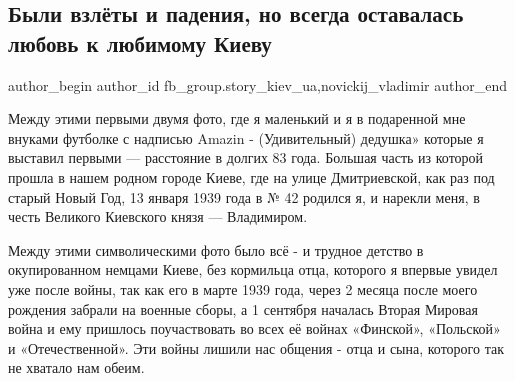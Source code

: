  
 
 
 
 
 
\subsection{Были взлёты и падения, но всегда оставалась любовь к любимому Киеву}
\label{sec:13_01_2022.fb.fb_group.story_kiev_ua.2.vzlety_i_padenia}
 
\ifcmt
 author_begin
   author_id fb_group.story_kiev_ua,novickij_vladimir
 author_end
\fi

Между этими первыми двумя фото, где я маленький и  я в подаренной мне внуками
футболке с надписью  Amazin - (Удивительный) дедушка» которые я выставил первыми
— расстояние в долгих 83 года.  Большая часть из которой прошла в нашем родном
городе Киеве, где на улице Дмитриевской, как раз под старый Новый Год, 13
января 1939 года  в № 42 родился я,  и нарекли меня, в честь Великого Киевского
князя — Владимиром. 


Между этими символическими фото  было всё - и трудное детство в окупированном
немцами Киеве, без кормильца отца, которого я впервые увидел уже после войны,
так как его в марте 1939 года, через 2 месяца после моего рождения забрали на
военные сборы, а  1 сентября началась Вторая Мировая война и ему пришлось
поучаствовать  во всех её войнах «Финской», «Польской» и «Отечественной». Эти
войны лишили нас общения - отца и сына, которого так не  хватало нам обеим.

